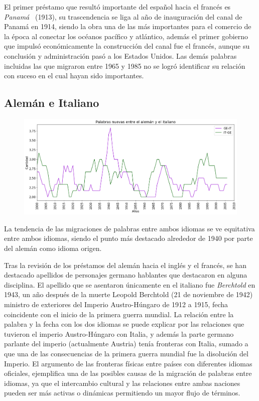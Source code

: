 El primer préstamo que resultó importante del español hacia el francés es \textit{Panamá}\,\,\, (1913), su trascendencia se liga al año de inauguración del canal de Panamá en 1914, siendo la obra una de las más importantes para el comercio de la época al conectar los océanos pacífico y atlántico, además el primer gobierno que impulsó económicamente la construcción del canal fue el francés,  aunque su conclusión y administración pasó a los Estados Unidos.  Las demás palabras incluidas las que migraron entre 1965 y 1985 no se logró identificar su relación con suceso  en el cual hayan sido importantes.

\hfill\break
\subsection{Alemán e Italiano}

\begin{figure}[h!]
	\centering
	\includegraphics[scale=.38]{Cap_2/NC_3_S2_GE.png}
	\label{NC_GI}
	\caption{}
\end{figure}

La tendencia de las migraciones de palabras entre ambos idiomas se ve equitativa entre ambos idiomas,  siendo el punto más destacado alrededor de 1940 por parte del alemán como idioma origen. 

Tras la revisión de los préstamos del alemán hacia el inglés y el francés, se han destacado apellidos de personajes germano hablantes que destacaron en alguna disciplina. El apellido que se asentaron únicamente en el  italiano fue \textit{Berchtold} en 1943,  un año después de la muerte Leopold Berchtold (21 de noviembre de 1942) ministro de exteriores del Imperio Austro-Húngaro de 1912 a 1915, fecha coincidente con el inicio de la primera guerra mundial.  La relación entre la palabra y la fecha con los dos idiomas se puede explicar por las relaciones que tuvieron el imperio Austro-Húngaro con Italia, y además la parte germano parlante del imperio (actualmente Austria) tenía  fronteras con Italia, sumado a que una de las consecuencias de la primera guerra mundial fue la disolución del Imperio.  El argumento de las fronteras físicas entre países con diferentes idiomas oficiales, ejemplifica una de las posibles causas de la migración de palabras entre idiomas, ya que el intercambio cultural  y las relaciones entre ambas naciones pueden ser más activas o dinámicas permitiendo un mayor flujo de términos. 

